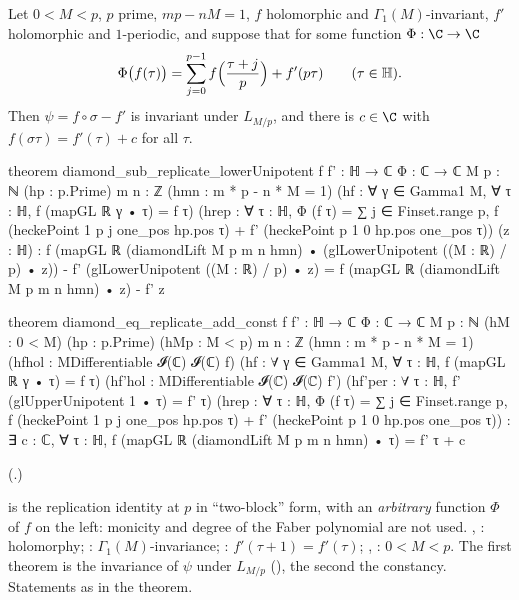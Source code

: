 \begin{theorem}\label{ch16:thm:diamondconst}
Let $0<M<p$, $p$ prime, $mp-nM=1$, $f$ holomorphic and $\Gamma_1(M)$-invariant, $f'$ holomorphic and $1$-periodic, and
suppose that for some function $\Phi:\C\to\C$
\begin{equation*}
  \Phi\bigl(f(\tau)\bigr)=\sum_{j=0}^{p-1}f\Bigl(\frac{\tau+j}p\Bigr)+f'(p\tau)\qquad(\tau\in\mathbb{H}).
\end{equation*}
Then $\psi=f\circ\sigma-f'$ is invariant under $L_{M/p}$, and there is $c\in\C$ with $f(\sigma\tau)=f'(\tau)+c$ for all
$\tau$.
\end{theorem}
\begin{leancode}
theorem diamond_sub_replicate_lowerUnipotent {f f' : ℍ → ℂ} {Φ : ℂ → ℂ} {M p : ℕ}
    (hp : p.Prime) {m n : ℤ} (hmn : m * p - n * M = 1)
    (hf : ∀ γ ∈ Gamma1 M, ∀ τ : ℍ, f (mapGL ℝ γ • τ) = f τ)
    (hrep : ∀ τ : ℍ, Φ (f τ) = ∑ j ∈ Finset.range p, f (heckePoint 1 p j one_pos hp.pos τ) +
      f' (heckePoint p 1 0 hp.pos one_pos τ)) (z : ℍ) :
    f (mapGL ℝ (diamondLift M p m n hmn) • (glLowerUnipotent ((M : ℝ) / p) • z)) -
        f' (glLowerUnipotent ((M : ℝ) / p) • z) =
      f (mapGL ℝ (diamondLift M p m n hmn) • z) - f' z

theorem diamond_eq_replicate_add_const {f f' : ℍ → ℂ} {Φ : ℂ → ℂ} {M p : ℕ} (hM : 0 < M)
    (hp : p.Prime) (hMp : M < p) {m n : ℤ} (hmn : m * p - n * M = 1)
    (hfhol : MDifferentiable 𝓘(ℂ) 𝓘(ℂ) f)
    (hf : ∀ γ ∈ Gamma1 M, ∀ τ : ℍ, f (mapGL ℝ γ • τ) = f τ)
    (hf'hol : MDifferentiable 𝓘(ℂ) 𝓘(ℂ) f')
    (hf'per : ∀ τ : ℍ, f' (glUpperUnipotent 1 • τ) = f' τ)
    (hrep : ∀ τ : ℍ, Φ (f τ) = ∑ j ∈ Finset.range p, f (heckePoint 1 p j one_pos hp.pos τ) +
      f' (heckePoint p 1 0 hp.pos one_pos τ)) :
    ∃ c : ℂ, ∀ τ : ℍ, f (mapGL ℝ (diamondLift M p m n hmn) • τ) = f' τ + c
\end{leancode}
(.)
\begin{dictionary}
 is the replication identity at $p$ in ``two-block'' form, with an \emph{arbitrary} function $\Phi$ of
$f$ on the left: monicity and degree of the Faber polynomial are not used.  , : holomorphy;
: $\Gamma_1(M)$-invariance; : $f'(\tau+1)=f'(\tau)$; , : $0<M<p$.  The first
theorem is the invariance of $\psi$ under $L_{M/p}$ (), the second the
constancy.  Statements as in the theorem.
\end{dictionary}

